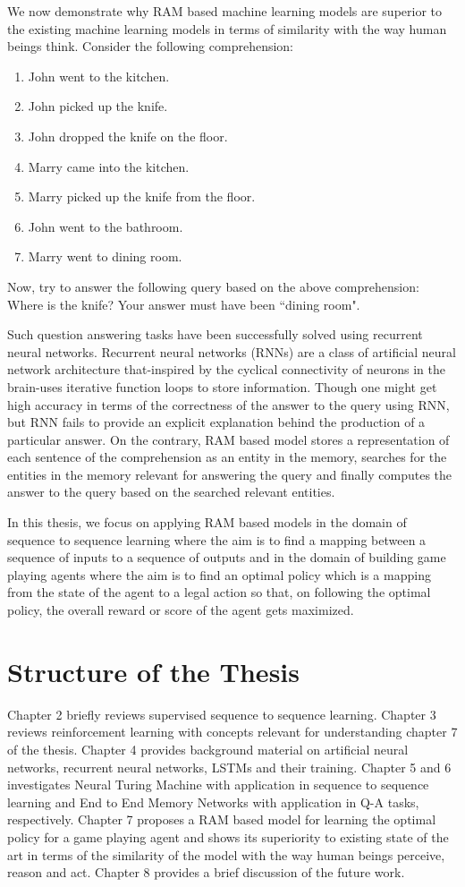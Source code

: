 We now demonstrate why RAM based machine learning models are superior to the existing machine learning models in terms of similarity with the way human beings think. Consider the following comprehension:
\begin{enumerate}
    \itemsep0em 
    \item John went to the kitchen.
    \item John picked up the knife.
    \item John dropped the knife on the floor.
    \item Marry came into the kitchen.
    \item Marry picked up the knife from the floor.
    \item John went to the bathroom.
    \item Marry went to dining room.
\end{enumerate}

Now, try to answer the following query based on the above comprehension: Where is the knife? Your answer must have been ``dining room".

Such question answering tasks have been successfully solved using recurrent neural networks. Recurrent neural networks (RNNs) are a class of artificial neural network architecture that-inspired by the cyclical connectivity of neurons in the brain-uses iterative function loops to store information. Though one might get high accuracy in terms of the correctness of the answer to the query using RNN, but RNN fails to provide an explicit explanation behind the production of a particular answer. On the contrary, RAM based model stores a representation of each sentence of the comprehension as an entity in the memory, searches for the entities in the memory relevant for answering the query and finally computes the answer to the query based on the searched relevant entities.

In this thesis, we focus on applying RAM based models in the domain of sequence to sequence learning where the aim is to find a mapping between a sequence of inputs to a sequence of outputs  and in the domain of building game playing agents where the aim is to find an optimal policy which is a mapping from the state of the agent to a legal action so that, on following the optimal policy, the overall reward or score of the agent gets maximized.

\section{Structure of the Thesis}
Chapter 2 briefly reviews supervised sequence to sequence learning. Chapter 3 reviews reinforcement learning with concepts relevant for understanding chapter 7 of the thesis. Chapter 4 provides background material on artificial neural networks, recurrent neural networks, LSTMs and their training. Chapter 5 and 6 investigates Neural Turing Machine with application in sequence to sequence learning and End to End Memory Networks with application in Q-A tasks, respectively. Chapter 7 proposes a RAM based model for learning the optimal policy for a game playing agent and shows its superiority to existing state of the art in terms of the similarity of the model with the way human beings perceive, reason and act. Chapter 8 provides a brief discussion of the future work.
